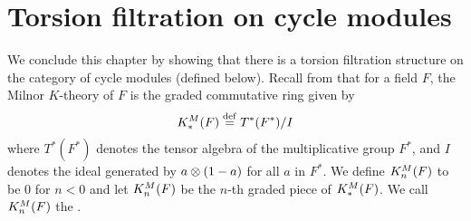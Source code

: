 \section{Torsion filtration on cycle modules}

We conclude this chapter by showing that there is a torsion 
filtration structure on the category of cycle modules (defined 
below). Recall from \cite{MilK} that for a field $F$, the Milnor 
$K$-theory of $F$ is the graded commutative ring given by
\[
K^M_*(F) \stackrel{\mathrm{def}}{=} T^*(F^*)/I
\]
where $T^*(F^*)$ denotes the tensor algebra of the multiplicative 
group $F^*$, and $I$ denotes the ideal generated by $a \otimes 
(1 - a)$ for all $a$ in $F^*$. We define $K^M_n(F)$ to be $0$
for $n < 0$ and let $K^M_n(F)$ be the $n$-th graded piece of 
$K^M_*(F)$. We call $K^M_n(F)$ the .

